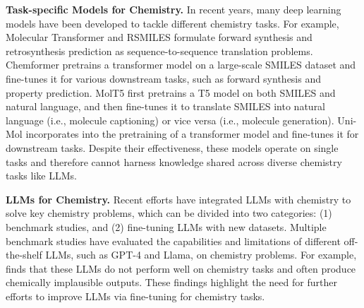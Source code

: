 \noindent \textbf{Task-specific Models for Chemistry.} 
In recent years, many deep learning models have been developed to tackle different chemistry tasks.
For example, Molecular Transformer \cite{schwaller2019molecular} and RSMILES \cite{Zhong2022} formulate forward synthesis and retrosynthesis prediction as sequence-to-sequence translation problems.
Chemformer \cite{irwin2022chemformer} pretrains a transformer model on a large-scale SMILES dataset and fine-tunes it for various downstream tasks, such as forward synthesis and property prediction.
MolT5 \cite{edwards2022translation} first pretrains a T5 model on both SMILES and natural language, and then fine-tunes it to translate SMILES into natural language (i.e., molecule captioning) or vice versa (i.e., molecule generation).
Uni-Mol \cite{zhou2023unimol} incorporates  into the pretraining of a transformer model and fine-tunes it for downstream tasks.
Despite their effectiveness, these models operate on single tasks and therefore cannot harness knowledge shared across diverse chemistry tasks like LLMs.

\noindent \textbf{LLMs for Chemistry.} 
Recent efforts have integrated LLMs with chemistry to solve key chemistry problems,
which can be divided into two categories: (1) benchmark studies, and (2) fine-tuning LLMs with new datasets. %
Multiple benchmark studies \cite{White2023,guo2023what,Jablonka2023,liu2023chatgpt} have evaluated 
the capabilities and limitations of different off-the-shelf LLMs, such as GPT-4 and Llama, on chemistry problems.
{For example, \citet{guo2023what} finds}
that these LLMs do not perform well on chemistry tasks and often produce
chemically implausible outputs.
These findings highlight the need for further efforts to improve LLMs via fine-tuning for chemistry tasks.

